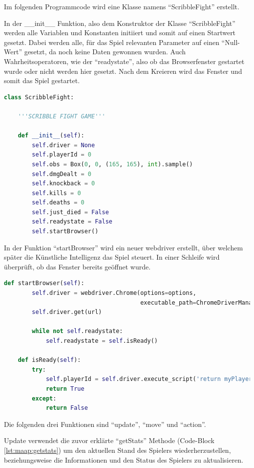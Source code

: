 Im folgenden Programmcode wird eine Klasse namens ``ScribbleFight'' erstellt.

In der \_\_init\_\_ Funktion, also dem Konstruktor der Klasse ``ScribbleFight'' werden alle Variablen und Konstanten initiiert und somit auf einen Startwert gesetzt. Dabei werden alle, für das Spiel relevanten Parameter auf einen ``Null-Wert'' gesetzt, da noch keine Daten gewonnen wurden. Auch Wahrheitsoperatoren, wie der ``readystate'', also ob das Browserfenster gestartet wurde oder nicht werden hier gesetzt. Nach dem Kreieren wird das Fenster und somit das Spiel gestartet.

\begin{lstlisting}[language=Python,firstnumber=25]
class ScribbleFight:

    '''SCRIBBLE FIGHT GAME'''

    def __init__(self):
        self.driver = None
        self.playerId = 0
        self.obs = Box(0, 0, (165, 165), int).sample()
        self.dmgDealt = 0
        self.knockback = 0
        self.kills = 0
        self.deaths = 0
        self.just_died = False
        self.readystate = False
        self.startBrowser()
\end{lstlisting}

In der Funktion ``startBrowser'' wird ein neuer webdriver erstellt, über welchem später die Künstliche Intelligenz das Spiel steuert.
In einer Schleife wird überprüft, ob das Fenster bereits geöffnet wurde.

\begin{lstlisting}[language=Python,firstnumber=41]
    def startBrowser(self):
        self.driver = webdriver.Chrome(options=options,
                                       executable_path=ChromeDriverManager().install())
        self.driver.get(url)

        while not self.readystate:
            self.readystate = self.isReady()

    def isReady(self):
        try:
            self.playerId = self.driver.execute_script('return myPlayer.id;')
            return True
        except:
            return False
\end{lstlisting}

Die folgenden drei Funktionen sind ``update'', ``move'' und ``action''.

Update verwendet die zuvor erklärte ``getStats'' Methode (Code-Block \ref{lst:maap:getstats}) um den aktuellen Stand des Spielers wiederherzustellen, beziehungsweise die Informationen und den Status des Spielers zu aktualisieren.

